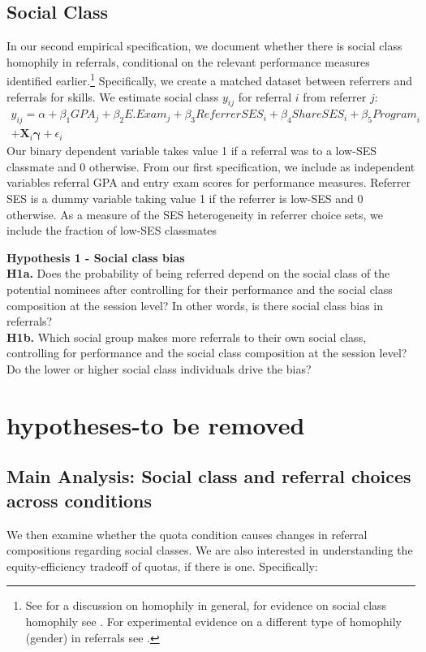 \documentclass[11pt,a4paper,oneside]{article}
\begin{document}
\subsection{Social Class}
In our second empirical specification, we document whether there is social class homophily in referrals, conditional on the relevant performance measures identified earlier.\footnote{See \citet{mcpherson2001birds} for a discussion on homophily in general, for evidence on social class homophily see \citet{chetty2022social,chetty2022socialb}. For experimental evidence on a different type of homophily (gender) in referrals see \citet{beaman_job_2018}.} Specifically, we create a matched dataset between referrers and referrals for skills. We estimate social class $y_{ij}$ for referral $i$ from referrer $j$: 
\begin{multline}
    y_{ij} = \alpha + \beta_1{GPA}_{j} + \beta_2{E.Exam}_{j} + \beta_3{ReferrerSES}_{i} + \beta_4{ShareSES}_{i} + \beta_5{Program}_{i} \\ +\mathbf{X}_{i}\boldsymbol{\gamma} +  \epsilon_{i}    
\end{multline}
Our binary dependent variable takes value 1 if a referral was to a low-SES classmate and 0 otherwise. From our first specification, we include as independent variables referral GPA and entry exam scores for performance measures. Referrer SES is a dummy variable taking value 1 if the referrer is low-SES and 0 otherwise. As a measure of the SES heterogeneity in referrer choice sets, we include the fraction of low-SES classmates 



\noindent\textbf{Hypothesis 1 - Social class bias}\\
\noindent\textbf{H1a.} Does the probability of being referred depend on the social class of the potential nominees after controlling for their performance and the social class composition at the session level? In other words, is there social class bias in referrals?\\
\noindent\textbf{H1b.} Which social group makes more referrals to their own social class, controlling for performance and the social class composition at the session level? Do the lower or higher social class individuals drive the bias?

\section{hypotheses-to be removed}
\subsection{Main Analysis: Social class and referral choices across conditions}
We then examine whether the quota condition causes changes in referral compositions regarding social classes. We are also interested in understanding the equity-efficiency tradeoff of quotas, if there is one. Specifically:\\
\end{document}

